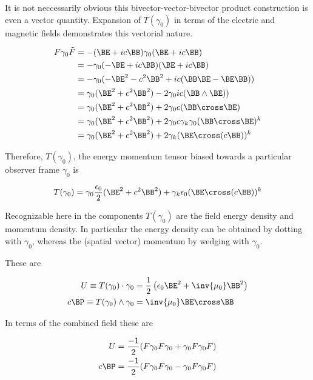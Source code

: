 It is not neccessarily obvious this bivector-vector-bivector product construction is even a vector quantity.
Expansion of $T(\gamma_0)$ in terms of
the electric and magnetic fields
demonstrates this vectorial nature.

\begin{align*}
F \gamma_0 \tilde{F}
&=
-(\BE + i c \BB) \gamma_0 (\BE + i c \BB) \\
&=
-\gamma_0 (-\BE + i c \BB) (\BE + i c \BB) \\
&=
-\gamma_0 (-\BE^2 - c^2 \BB^2 + i c (\BB \BE - \BE \BB) ) \\
&=
\gamma_0 (\BE^2 + c^2 \BB^2) - 2 \gamma_0 i c (\BB \wedge \BE) ) \\
&=
\gamma_0 (\BE^2 + c^2 \BB^2) + 2 \gamma_0 c (\BB \cross \BE) \\
&=
\gamma_0 (\BE^2 + c^2 \BB^2) + 2 \gamma_0 c \gamma_k \gamma_0 (\BB \cross \BE)^k \\
&=
\gamma_0 (\BE^2 + c^2 \BB^2) + 2 \gamma_k (\BE \cross (c \BB))^k \\
\end{align*}

Therefore, $T(\gamma_0)$, the energy momentum tensor biased towards a particular observer frame $\gamma_0$
is

\begin{align}
T(\gamma_0)
&=
\gamma_0 \frac{\epsilon_0}{2} (\BE^2 + c^2 \BB^2) + \gamma_k \epsilon_0 (\BE \cross (c \BB))^k \\
\end{align}

Recognizable here in the components $T(\gamma_0)$ are the field energy density and momentum density.  In particular
the energy density can be obtained by dotting with $\gamma_0$, whereas the (spatial vector) momentum by wedging with
$\gamma_0$.

These are

\begin{align}
U \equiv T(\gamma_0) \cdot \gamma_0 &= \frac{1}{2} \left( \epsilon_0 \BE^2 + \inv{\mu_0} \BB^2 \right) \\
c \BP \equiv T(\gamma_0) \wedge \gamma_0 &= \inv{\mu_0} \BE \cross \BB
\end{align}

In terms of the combined field these are

\begin{align}
U &= \frac{-1}{2}( F \gamma_0 F \gamma_0 + \gamma_0 F \gamma_0 F) \\
c \BP &= \frac{-1}{2}( F \gamma_0 F \gamma_0 - \gamma_0 F \gamma_0 F)
\end{align}

